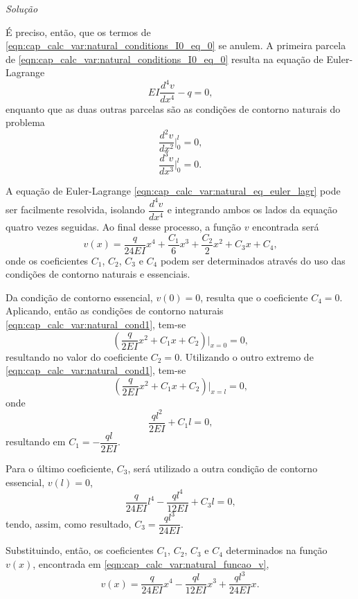 \documentclass[
	12pt,				%
	openright,			%
    twoside,			%
	a4paper,			%
	english,			%
	french,				%
	spanish,			%
	brazil				%
	]{abntex2}
\makeatletter
\renewenvironment{proof}[1][\proofname]{
	\par\pushQED{\qed}%
	\normalfont \topsep6\p@\@plus6\p@\relax
	\trivlist
	\item\relax
		{\itshape
			#1\@addpunct{.}}\hspace\labelsep\ignorespaces
}{%
	\popQED\endtrivlist\@endpefalse
}
\newenvironment{solution}{
	\begin{proof}[Solução]
}{%
	\end{proof}
}
\numberwithin{lema}{chapter}
\numberwithin{teorema}{chapter}
\numberwithin{definicao}{chapter}
\numberwithin{exemplo}{chapter}
\numberwithin{figure}{chapter}
\makeatother
\begin{document}
\begin{solution}
	É preciso, então, que os termos de \eqref{eqn:cap_calc_var:natural_conditions_I0_eq_0} se anulem. A primeira parcela de \eqref{eqn:cap_calc_var:natural_conditions_I0_eq_0} resulta na equação de Euler-Lagrange
	\begin{equation}
		\label{eqn:cap_calc_var:natural_eq_euler_lagr}
		EI\frac{d^4v}{dx^4} - q = 0
		\text{,}
	\end{equation}
	enquanto que as duas outras parcelas são as condições de contorno naturais do problema
	\begin{equation}
		\label{eqn:cap_calc_var:natural_cond1}
		\frac{d^2 v}{dx^2}\Big |_{0}^{l} = 0
		\text{,}
	\end{equation}
	\begin{equation}
		\label{eqn:cap_calc_var:natural_cond2}
		\frac{d^3 v}{dx^3}\Big |_{0}^{l} = 0
		\text{.}
	\end{equation}

	A equação de Euler-Lagrange \eqref{eqn:cap_calc_var:natural_eq_euler_lagr} pode ser facilmente resolvida, isolando $\dfrac{d^4 v}{dx^4}$ e integrando ambos os lados da equação quatro vezes seguidas. Ao final desse processo, a função $v$ encontrada será
	\begin{equation}
		\label{eqn:cap_calc_var:natural_funcao_v}
		v(x)=\frac{q}{24EI}x^4 + \frac{C_1}{6}x^3 + \frac{C_2}{2}x^2 + C_3x + C_4
		\text{,}
	\end{equation}
	onde os coeficientes $C_1$, $C_2$, $C_3$ e $C_4$ podem ser determinados através do uso das condições de contorno naturais e essenciais.

	Da condição de contorno essencial, $v(0)=0$, resulta que o coeficiente $C_4=0$. Aplicando, então as condições de contorno naturais \eqref{eqn:cap_calc_var:natural_cond1}, tem-se
	$$
		\left (
			\frac{q}{2EI}x^2 + C_1x + C_2
		\right ) \Big |_{x=0}
		= 0
		\text{,}
	$$
	resultando no valor do coeficiente $C_2=0$. Utilizando o outro extremo de \eqref{eqn:cap_calc_var:natural_cond1}, tem-se
	$$
		\left (
			\frac{q}{2EI}x^2 + C_1x + C_2
		\right ) \Big |_{x=l}
		=0
		\text{,}
	$$
	onde
	$$
		\frac{ql^2}{2EI}+C_1l=0
		\text{,}
	$$
	resultando em $C_1=-\dfrac{ql}{2EI}$.

	Para o último coeficiente, $C_3$, será utilizado a outra condição de contorno essencial, $v(l)=0$,
	$$
		\frac{q}{24EI}l^4
		-
		\frac{ql^4}{12EI}
		+
		C_3l
		= 0
		\text{,}
	$$
	tendo, assim, como resultado, $C_3=\dfrac{ql^3}{24EI}$.

	Substituindo, então, os coeficientes $C_1$, $C_2$, $C_3$ e $C_4$ determinados na função $v(x)$, encontrada em \eqref{eqn:cap_calc_var:natural_funcao_v},
	\begin{equation}
	\label{eqn:sol_funcional_analitico}
	v(x) = 
		\frac{q}{24EI} x^4
		-
		\frac{ql}{12EI} x^3
		+
		\frac{ql^3}{24EI} x
		\text{.}
	\end{equation}
\end{solution}
\end{document}
